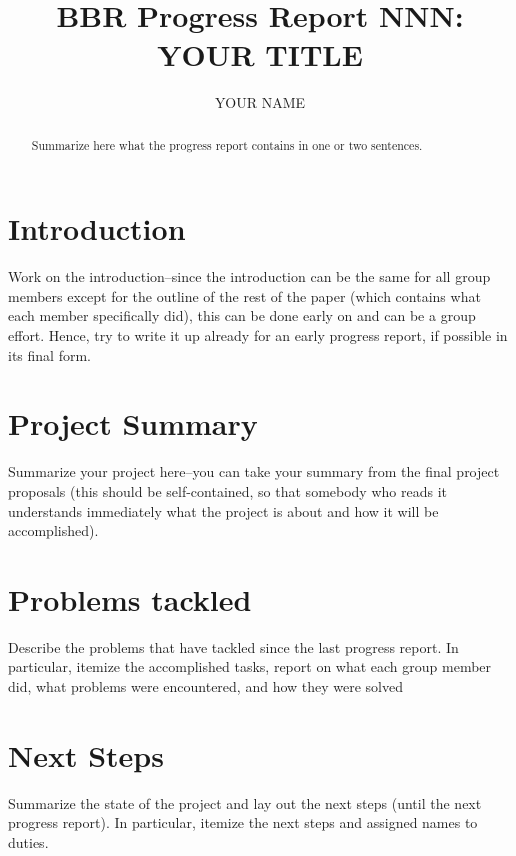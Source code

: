 \documentclass[12pt]{article}
\begin{document}
\title{BBR Progress Report NNN:\\YOUR TITLE}

\author{YOUR NAME}

\maketitle

\begin{abstract}
Summarize here what the progress report contains in one or two sentences.
\end{abstract}


\section{Introduction}

Work on the introduction--since the introduction can be the same for
all group members except for the outline of the rest of the paper
(which contains what each member specifically did), this can be done
early on and can be a group effort.  Hence, try to write it up already
for an early progress report, if possible in its final form.


\section{Project Summary}

Summarize your project here--you can take your summary from the final
project proposals (this should be self-contained, so that somebody who
reads it understands immediately what the project is about and how it
will be accomplished).

\section{Problems tackled}

Describe the problems that have tackled since the last progress
report.  In particular, itemize the accomplished tasks, report on what
each group member did, what problems were encountered, and how they
were solved

\section{Next Steps}

Summarize the state of the project and lay out the next steps (until
the next progress report).  In particular, itemize the next steps and
assigned names to duties.
\end{document}
